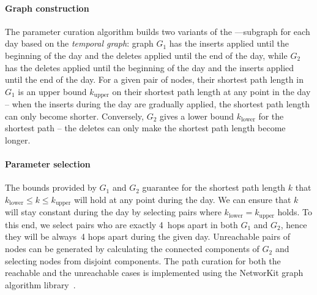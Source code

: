 \paragraph{Graph construction}
%
The parameter curation algorithm builds two variants of the \Person--\knows--\Person subgraph for each day based on the \emph{temporal graph}:
graph $G_1$ has the inserts applied until the beginning of the day and the deletes applied until the end of the day,
while $G_2$ has the deletes applied until the beginning of the day and the inserts applied until the end of the day.
For a given pair of \Person nodes, their shortest path length in $G_1$ is an upper bound $k_\mathrm{upper}$ on their shortest path length at any point in the day -- when the inserts during the day are gradually applied, the shortest path length can only become shorter.
Conversely, $G_2$ gives a lower bound $k_\mathrm{lower}$ for the shortest path -- the deletes can only make the shortest path length become longer.

\paragraph{Parameter selection}
The bounds provided by $G_1$ and $G_2$ guarantee for the shortest path length $k$ that $k_\mathrm{lower} \leq k \leq k_\mathrm{upper}$ will hold at any point during the day.
We can ensure that $k$ will stay constant during the day by selecting \Person pairs where $k_\mathrm{lower} = k_\mathrm{upper}$ holds.
To this end, we select pairs who are exactly 4~hops apart in both $G_1$ and $G_2$, hence they will be always~4 hops apart during the given day.
Unreachable pairs of nodes can be generated by calculating the connected components of $G_2$ and selecting nodes from disjoint components.
The path curation for both the reachable and the unreachable cases is implemented using the NetworKit graph algorithm library~\cite{lit:networkit}.

